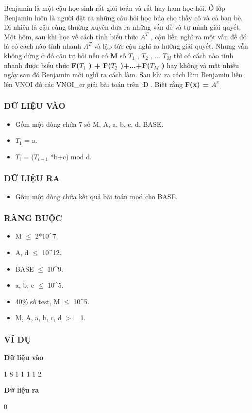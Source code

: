 



   Benjamin là một cậu học sinh rất giỏi toán và rất hay ham học hỏi. Ở lớp Benjamin luôn là người đặt ra những câu hỏi học búa cho thầy cô và cả bạn bè. Dĩ nhiên là cậu cùng thường xuyên đưa ra những vấn đề và tự mình giải quyết. Một hôm, sau khi học về cách tính biểu thức   \textbf{    $A^{T}$}   , cậu liền nghĩ ra một vấn đề đó là có cách nào tính nhanh   \textbf{    $A^{T}$}   và lập tức cậu nghĩ ra hướng giải quyết. Nhưng vẫn không dừng ở đó cậu tự hỏi nếu có   \textbf{    M   }   số   \textbf{    $T_{1}$}   ,   \textbf{    $T_{2}$}   , ...   \textbf{    $T_{M}$}   thì có cách nào tính nhanh được biểu thức   \textbf{    F($T_{1}$    ) + F($T_{2}$    )+...+F($T_{M}$    )   }   hay không và mất nhiều ngày sau đó Benjamin mới nghĩ ra cách làm. Sau khi ra cách làm Benjamin liền lên VNOI đố các VNOI\_er giải bài toán trên :D . Biết rằng   \textbf{    F(x) = $A^{x}$}$_    .   $

\subsubsection{   DỮ LIỆU VÀO  }


\begin{itemize}
	\item     Gồm một dòng chứa 7 số M, A, a, b, c, d, BASE.   
	\item     $T_{1}$    = a.   
	\item     $T_{i}$    = ($T_{i-1}$    *b+c) mod d.   
\end{itemize}



\subsubsection{   DỮ LIỆU RA  }
\begin{itemize}
	\item     Gồm một dòng chứa kết quả bài toán mod cho BASE.   
\end{itemize}

\subsubsection{   RÀNG BUỘC  }


\begin{itemize}
	\item     M  $\le$  2*10^7.   
	\item     A, d  $\le$  10^12.   
	\item     BASE  $\le$  10^9.   
	\item     a, b, c  $\le$  10^5.   
	\item     40\% số test, M  $\le$  10^5.   
	\item     M, A, a, b, c, d $>$= 1.   
\end{itemize}



\subsubsection{   VÍ DỤ  }

\textbf{    Dữ liệu vào   }

   1 8 1 1 1 1 2  

\textbf{    Dữ liệu ra   }

   0  



